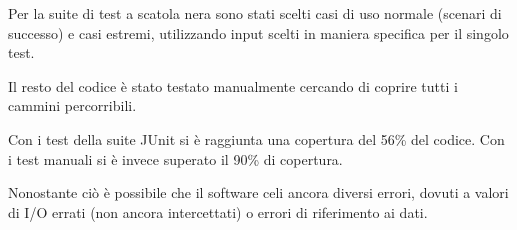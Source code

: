 \documentclass[12pt]{report}
\begin{document}
	Per la suite di test a scatola nera sono stati scelti casi di uso normale (scenari di successo) e casi estremi, utilizzando input scelti in maniera specifica per il singolo test.
	
	Il resto del codice è stato testato manualmente cercando di coprire tutti i cammini percorribili.
	
	Con i test della suite JUnit si è raggiunta una copertura del 56\% del codice. Con i test manuali si è invece superato il 90\% di copertura.
	
	Nonostante ciò è possibile che il software celi ancora diversi errori, dovuti a valori di I/O errati (non ancora intercettati) o errori di riferimento ai dati. 
	
	
	
	
\end{document}

